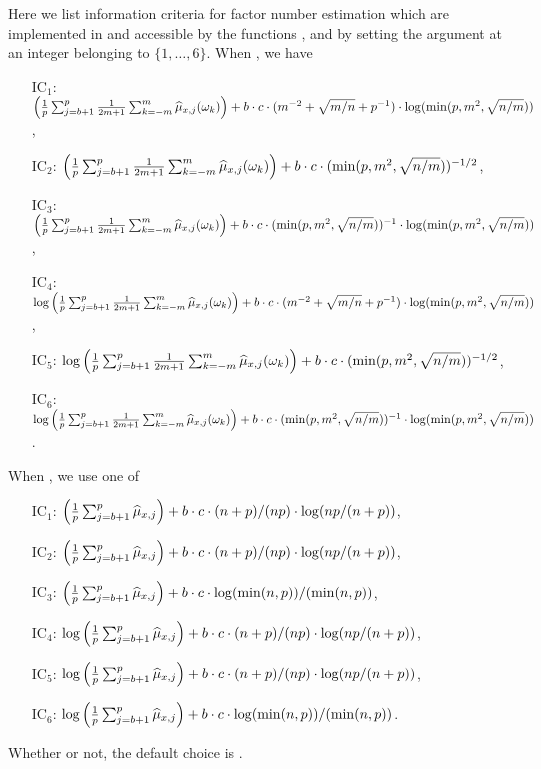 Here we list information criteria for factor number estimation which are implemented in  and accessible by the functions ,  and  by setting the argument  at an integer belonging to $\{1, \ldots, 6\}$.
When , we have
\begin{itemize}
    \item[IC$_1$:] 	$ \left(\frac{1}{p} \sum _{j = b + 1}^p \frac{1}{2m + 1} \sum_{k = -m}^m \widehat{\mu}_{x, j}(\omega_k) \right)
 + b \cdot c \cdot( m^{-2} + \sqrt{m / n} + p^{-1}) \cdot \log(\min (p, m^2, \sqrt{n / m} ))$,
     \item[IC$_2$:] 	$ \left(\frac{1}{p} \sum _{j = b + 1}^p \frac{1}{2m + 1} \sum_{k = -m}^m \widehat{\mu}_{x, j}(\omega_k) \right)
 + b \cdot c \cdot (\min(p, m^2, \sqrt{n / m}))^{-1/2}$, 
      \item[IC$_3$:] 	$ \left(\frac{1}{p} \sum _{j = b + 1}^p \frac{1}{2m + 1} \sum_{k = -m}^m \widehat{\mu}_{x, j}(\omega_k) \right) 
 + b \cdot c \cdot (\min(p, m^2, \sqrt{n / m}))^{-1} \cdot \log(\min(p, m^2, \sqrt{n / m}))$,
    \item[IC$_4$:] 	$\log \left(\frac{1}{p} \sum _{j = b + 1}^p \frac{1}{2m + 1} \sum_{k = -m}^m \widehat{\mu}_{x, j}(\omega_k) \right) 
 + b \cdot c \cdot( m^{-2} + \sqrt{m / n} + p^{-1}) \cdot \log(\min (p, m^2, \sqrt{n / m} ))$,
     \item[IC$_5$:] 	$\log \left(\frac{1}{p} \sum _{j = b + 1}^p \frac{1}{2m + 1} \sum_{k = -m}^m \widehat{\mu}_{x, j}(\omega_k) \right) 
 + b \cdot c \cdot (\min(p, m^2, \sqrt{n / m}))^{-1/2}$,
      \item[IC$_6$:] 	$\log \left(\frac{1}{p} \sum _{j = b + 1}^p \frac{1}{2m + 1} \sum_{k = -m}^m \widehat{\mu}_{x, j}(\omega_k) \right) 
 + b \cdot c \cdot (\min(p, m^2, \sqrt{n / m}))^{-1} \cdot \log(\min(p, m^2, \sqrt{n / m}))$ .
\end{itemize}
When , we use one of 
\begin{itemize}
    \item[IC$_1$:] $ \left(\frac{1}{p} \sum _{j = b + 1}^p \widehat{\mu}_{x, j} \right)
 + b \cdot c \cdot (n + p) / (n p) \cdot \log(n p / (n + p))$,
     \item[IC$_2$:] $ \left(\frac{1}{p} \sum _{j = b + 1}^p \widehat{\mu}_{x, j} \right)
 + b \cdot c \cdot (n + p) / (n p) \cdot \log(n p / (n + p))$,
      \item[IC$_3$:] 	$ \left(\frac{1}{p} \sum _{j = b + 1}^p \widehat{\mu}_{x, j} \right) 
 + b \cdot c \cdot \log(\min(n, p)) / (\min(n, p))$,
    \item[IC$_4$:] $ \log\left(\frac{1}{p} \sum _{j = b + 1}^p \widehat{\mu}_{x, j} \right)
 + b \cdot c \cdot (n + p) / (n p) \cdot \log(n p / (n + p))$,
     \item[IC$_5$:] $ \log\left(\frac{1}{p} \sum _{j = b + 1}^p \widehat{\mu}_{x, j} \right)
 + b \cdot c \cdot (n + p) / (n p) \cdot \log(n p / (n + p))$,
      \item[IC$_6$:] 	$ \log\left(\frac{1}{p} \sum _{j = b + 1}^p \widehat{\mu}_{x, j} \right) 
 + b \cdot c \cdot \log(\min(n, p)) / (\min(n, p))$.
\end{itemize}
Whether  or not, the default choice is .
      
